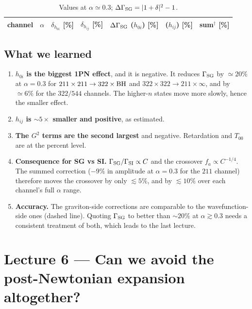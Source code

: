 \documentclass[11pt]{article}
\begin{document}
\begin{table}[h]
\centering\small
\begin{tabular}{@{}lcccccc@{}}
\toprule
channel & $\alpha$ & $\delta_{h_{0i}}$ [\%] & $\delta_{h_{ij}}$ [\%] & $\Delta\Gamma_{\rm SG}$ ($h_{0i}$) [\%] & ($h_{ij}$) [\%] & sum$^\dagger$ [\%]\\\midrule

\bottomrule
\end{tabular}
\caption{Values at $\alpha\simeq0.3$; $\Delta\Gamma_{\rm SG}=|1+\delta|^2-1$.}
\label{tab:values}
\end{table}

\subsection{What we learned}
\begin{enumerate}[leftmargin=1.4em]
\item \textbf{$h_{0i}$ is the biggest 1PN effect}, and it is negative. It reduces $\Gamma_{\rm SG}$ by $\simeq20\%$ at $\alpha=0.3$ for $211\times211\to322\times{\rm BH}$ and $322\times322\to211\times\infty$, and by $\simeq6\%$ for the $322/544$ channels. The higher-$n$ states move more slowly, hence the smaller effect.
\item \textbf{$h_{ij}$ is $\sim5\times$ smaller and positive}, as estimated.
\item \textbf{The $G^2$ terms are the second largest} and negative. Retardation and $T_{00}$ are at the percent level.
\item \textbf{Consequence for SG vs SI.} $\Gamma_{\rm SG}/\Gamma_{\rm SI}\propto C$ and the crossover $f_a\propto C^{-1/4}$. The summed correction ($-9\%$ in amplitude at $\alpha=0.3$ for the $211$ channel) therefore moves the crossover by only $\lesssim5\%$, and by $\lesssim10\%$ over each channel's full $\alpha$ range.
\item \textbf{Accuracy.} The graviton-side corrections are comparable to the wavefunction-side ones (dashed line). Quoting $\Gamma_{\rm SG}$ to better than $\sim20\%$ at $\alpha\gtrsim0.3$ needs a consistent treatment of both, which leads to the last lecture.
\end{enumerate}

\section{Lecture 6 --- Can we avoid the post-Newtonian expansion altogether?}
\end{document}
